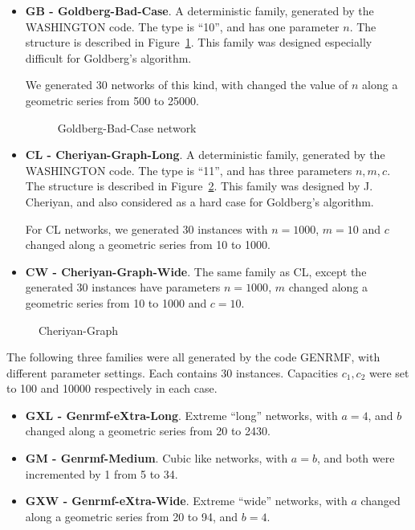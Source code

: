 \begin{itemize}
\item {\bf GB - Goldberg-Bad-Case}. A deterministic family, generated
by the WASHINGTON code. The type is ``10'', and has one parameter $n$.
The structure is described in Figure~\ref{GB-net}. This family was
designed especially difficult for Goldberg's algorithm.

We generated 30 networks of this kind, with changed the value of $n$
along a geometric series from 500 to 25000.

\begin{figure}[h]
\centerline{}
\caption{ Goldberg-Bad-Case network \label{GB-net}}
\end{figure}

\item   {\bf CL - Cheriyan-Graph-Long}. A deterministic family,
generated by the WASHINGTON code. The type is ``11'', and has three
parameters $n, m, c$. The structure is described in Figure~\ref{Cher-net}. This family was designed by J. Cheriyan, and
also considered as a hard case for Goldberg's algorithm. 

For CL networks, we generated 30 instances with $n=1000$, $m=10$ and 
$c$ changed along a geometric series from 10 to 1000.

\item   {\bf CW - Cheriyan-Graph-Wide}. The same family as CL, except
the generated 30 instances have parameters $n=1000$, $m$
changed along a geometric series from 10 to 1000 and $c=10$.
\end{itemize}

\begin{figure}[h]
\centerline{}
\caption{ Cheriyan-Graph \label {Cher-net}}
\end{figure}
\clearpage
The following three families were all generated by the code GENRMF,
with different parameter settings. Each contains 30 instances.
Capacities $c_1, c_2$ were set to 100 and 10000 respectively in each
case. 

\begin{itemize}
\item {\bf GXL - Genrmf-eXtra-Long}. Extreme ``long'' networks, with
$a=4$, and $b$ changed along a geometric series from 20 to 2430.

\item {\bf GM - Genrmf-Medium}. Cubic like networks, with $a=b$, and
both were incremented by 1 from 5 to 34.

\item {\bf GXW - Genrmf-eXtra-Wide}. Extreme ``wide'' networks, with
$a$ changed along a geometric series from 20 to 94, and $b=4$.

\end{itemize}

